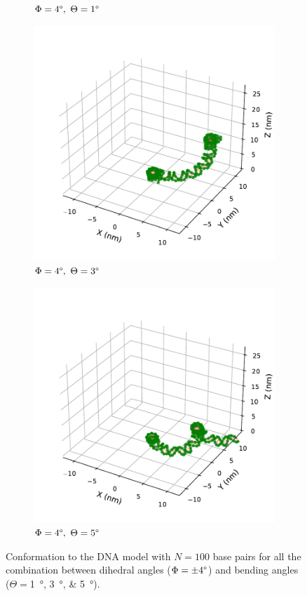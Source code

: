 \documentclass[a4paper,10pt]{article}
\begin{document}
\begin{figure}[tb]
\begin{subfigure}{0.3\textwidth}
\caption{$\Phi=4\degree,\ \Theta=1\degree$}
\label{fig:bend_d}
\end{subfigure}
\begin{subfigure}{0.3\textwidth}
\includegraphics[width=\textwidth]{bw_4_3.pdf}
\caption{$\Phi=4\degree,\ \Theta=3\degree$}
\label{fig:bend_e}
\end{subfigure}
\begin{subfigure}{0.3\textwidth}
\includegraphics[width=\textwidth]{bw_4_5.pdf}
\caption{$\Phi=4\degree,\ \Theta=5\degree$}
\label{fig:bend_f}
\end{subfigure}
\caption{Conformation to the DNA model with $N=100$ base pairs for all the combination between dihedral angles ($\Phi=\pm 4\degree$) and bending angles ($\Theta=$\SIlist{1;3;5}{\degree}).}
\label{fig:bend}
\end{figure}
\end{document}
